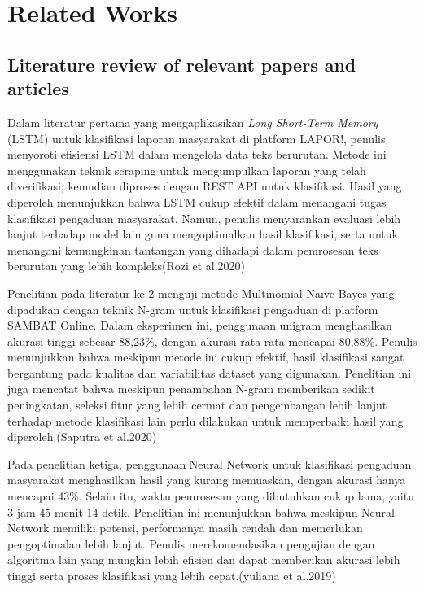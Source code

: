 \documentclass[12pt,a4paper]{article}
\begin{document}
\section{Related Works}
\subsection{Literature review of relevant papers and articles}
\begin{adjustwidth}{3em}{0pt} 
\hspace{0.5cm} Dalam literatur pertama yang mengaplikasikan \textit{Long Short-Term Memory} (LSTM) untuk klasifikasi laporan masyarakat di platform LAPOR!, penulis menyoroti efisiensi LSTM dalam mengelola data teks berurutan. Metode ini menggunakan teknik scraping untuk mengumpulkan laporan yang telah diverifikasi, kemudian diproses dengan REST API untuk klasifikasi. Hasil yang diperoleh menunjukkan bahwa LSTM cukup efektif dalam menangani tugas klasifikasi pengaduan masyarakat. Namun, penulis menyarankan evaluasi lebih lanjut terhadap model lain guna mengoptimalkan hasil klasifikasi, serta untuk menangani kemungkinan tantangan yang dihadapi dalam pemrosesan teks berurutan yang lebih kompleks(Rozi et al.2020)

\hspace{0.5cm} Penelitian pada literatur ke-2 menguji metode Multinomial Naïve Bayes yang dipadukan dengan teknik N-gram untuk klasifikasi pengaduan di platform SAMBAT Online. Dalam eksperimen ini, penggunaan unigram menghasilkan akurasi tinggi sebesar 88,23\%, dengan akurasi rata-rata mencapai 80,88\%. Penulis menunjukkan bahwa meskipun metode ini cukup efektif, hasil klasifikasi sangat bergantung pada kualitas dan variabilitas dataset yang digunakan. Penelitian ini juga mencatat bahwa meskipun penambahan N-gram memberikan sedikit peningkatan, seleksi fitur yang lebih cermat dan pengembangan lebih lanjut terhadap metode klasifikasi lain perlu dilakukan untuk memperbaiki hasil yang diperoleh.(Saputra et al.2020)

\hspace{0.5cm} Pada penelitian ketiga, penggunaan Neural Network untuk klasifikasi pengaduan masyarakat menghasilkan hasil yang kurang memuaskan, dengan akurasi hanya mencapai 43\%. Selain itu, waktu pemrosesan yang dibutuhkan cukup lama, yaitu 3 jam 45 menit 14 detik. Penelitian ini menunjukkan bahwa meskipun Neural Network memiliki potensi, performanya masih rendah dan memerlukan pengoptimalan lebih lanjut. Penulis merekomendasikan pengujian dengan algoritma lain yang mungkin lebih efisien dan dapat memberikan akurasi lebih tinggi serta proses klasifikasi yang lebih cepat.(yuliana et al.2019)


\end{adjustwidth}
\end{document}
